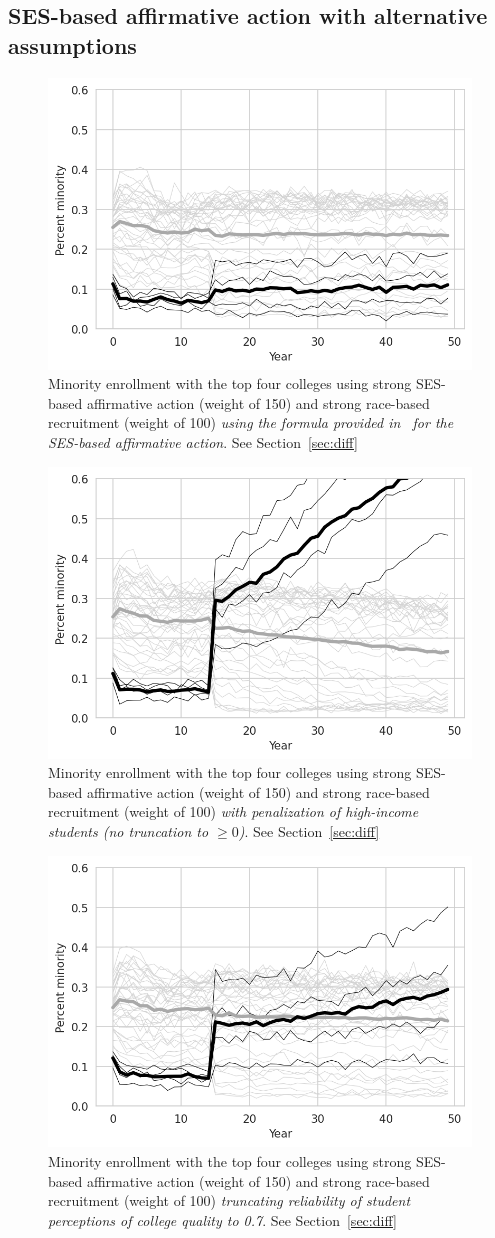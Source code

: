 \begin{appendices}
\section{SES-based affirmative action with alternative assumptions}
\begin{figure}[ht!]
  \centering
  \includegraphics[width=.49\textwidth]{figures/figC4_f1.png}
  \caption{Minority enrollment with the top four colleges using strong SES-based affirmative action (weight of 150) and strong race-based recruitment (weight of 100) \emph{using the formula provided in~\cite{reardon2018levels} for the SES-based affirmative action}. See Section~\ref{sec:diff}}
  \label{fig:c4_f1}
\end{figure}

\begin{figure}[ht!]
  \centering
  \includegraphics[width=.49\textwidth]{figures/figC4_pen.png}
  \caption{Minority enrollment with the top four colleges using strong SES-based affirmative action (weight of 150) and strong race-based recruitment (weight of 100) \emph{with penalization of high-income students (no truncation to $\geq 0$)}. See Section~\ref{sec:diff}}
  \label{fig:c4_pen}
\end{figure}

\begin{figure}[ht!]
  \centering
  \includegraphics[width=.49\textwidth]{figures/figC4_pq07.png}
  \caption{Minority enrollment with the top four colleges using strong SES-based affirmative action (weight of 150) and strong race-based recruitment (weight of 100) \emph{truncating reliability of student perceptions of college quality to 0.7}. See Section~\ref{sec:diff}}
  \label{fig:c4_pq07}
\end{figure}
\end{appendices}